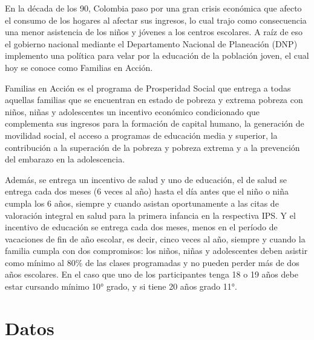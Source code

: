 \documentclass[AER]{AEA}
\begin{document}
En la década de los 90, Colombia paso por una gran crisis económica que afecto el consumo de los hogares al afectar sus ingresos, lo cual trajo como consecuencia una menor asistencia de los niños y jóvenes a los centros escolares. A raíz de eso el gobierno nacional mediante el Departamento Nacional de Planeación (DNP) implemento una política para velar por la educación de la población joven, el cual hoy se conoce como Familias en Acción.

Familias en Acción es el programa de Prosperidad Social que entrega a todas aquellas familias que se encuentran en estado de pobreza y extrema pobreza con niños, niñas y adolescentes un incentivo económico condicionado que complementa sus ingresos para la formación de capital humano, la generación de movilidad social, el acceso a programas de educación media y superior, la contribución a la superación de la pobreza y pobreza extrema y a la prevención del embarazo en la adolescencia. 

Además, se entrega un incentivo de salud y uno de educación, el de salud se entrega cada dos meses (6 veces al año) hasta el día antes que el niño o niña cumpla los 6 años, siempre y cuando asistan oportunamente a las citas de valoración integral en salud para la primera infancia en la respectiva IPS. Y el incentivo de educación se entrega cada dos meses, menos en el período de vacaciones de fin de año escolar, es decir, cinco veces al año, siempre y cuando la familia cumpla con dos compromisos: los niños, niñas y adolescentes deben asistir como mínimo al 80\% de las clases programadas y no pueden perder más de dos años escolares. En el caso que uno de los participantes tenga 18 o 19 años debe estar cursando mínimo 10° grado, y si tiene 20 años grado 11°.


\section{Datos}

\end{document}
